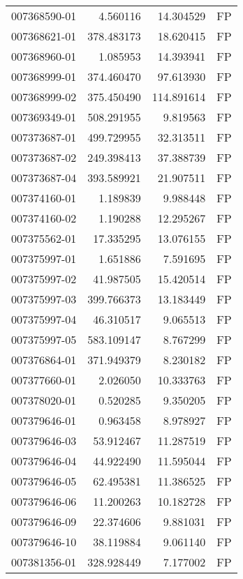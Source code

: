 \begin{tabular}{lrrl}
007368590-01 &    4.560116 &      14.304529 &   FP \\
007368621-01 &  378.483173 &      18.620415 &   FP \\
007368960-01 &    1.085953 &      14.393941 &   FP \\
007368999-01 &  374.460470 &      97.613930 &   FP \\
007368999-02 &  375.450490 &     114.891614 &   FP \\
007369349-01 &  508.291955 &       9.819563 &   FP \\
007373687-01 &  499.729955 &      32.313511 &   FP \\
007373687-02 &  249.398413 &      37.388739 &   FP \\
007373687-04 &  393.589921 &      21.907511 &   FP \\
007374160-01 &    1.189839 &       9.988448 &   FP \\
007374160-02 &    1.190288 &      12.295267 &   FP \\
007375562-01 &   17.335295 &      13.076155 &   FP \\
007375997-01 &    1.651886 &       7.591695 &   FP \\
007375997-02 &   41.987505 &      15.420514 &   FP \\
007375997-03 &  399.766373 &      13.183449 &   FP \\
007375997-04 &   46.310517 &       9.065513 &   FP \\
007375997-05 &  583.109147 &       8.767299 &   FP \\
007376864-01 &  371.949379 &       8.230182 &   FP \\
007377660-01 &    2.026050 &      10.333763 &   FP \\
007378020-01 &    0.520285 &       9.350205 &   FP \\
007379646-01 &    0.963458 &       8.978927 &   FP \\
007379646-03 &   53.912467 &      11.287519 &   FP \\
007379646-04 &   44.922490 &      11.595044 &   FP \\
007379646-05 &   62.495381 &      11.386525 &   FP \\
007379646-06 &   11.200263 &      10.182728 &   FP \\
007379646-09 &   22.374606 &       9.881031 &   FP \\
007379646-10 &   38.119884 &       9.061140 &   FP \\
007381356-01 &  328.928449 &       7.177002 &   FP \\

\end{tabular}
